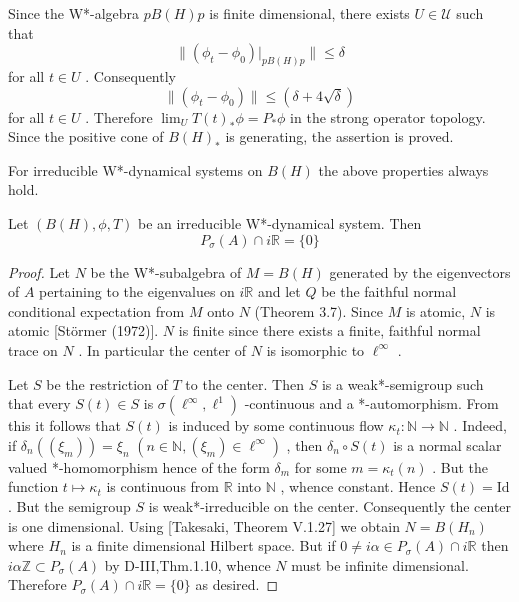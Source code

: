 Since the W*-algebra $ pB(H)p $  is finite dimensional, there exists $ U \in \mathcal{U} $  such that
\[
\|(\phi_{t} - \phi_{0})|_{pB(H)p}\| \leq \delta
\]
for all $ t \in U $ .
Consequently
\[
\|(\phi_{t} - \phi_{0})\| \leq (\delta + 4\sqrt{\delta})
\]
for all $ t \in U $ .
Therefore $ \lim_{U} T(t)_{*}\phi = P_{*}\phi $  in the strong operator topology.
Since the positive cone of $ B(H)_{*} $  is generating, the assertion is proved.

For irreducible W*-dynamical systems on $ B(H) $  the above properties always hold.

\begin{theorem}\label{thm:d4-3.8}
Let $ (B(H),\phi,T) $  be an irreducible W*-dynamical system.
Then
\[
P_{\sigma}(A) \cap i\mathbb{R} = \{0\}
\]
\end{theorem}

\newpage

\begin{proof}
Let $ N $  be the W*-subalgebra of $ M = B(H) $  generated by the eigenvectors of $ A $  pertaining to the eigenvalues on $ i\mathbb{R} $  and let $ Q $  be the faithful normal conditional expectation from $ M $  onto $ N $  (Theorem 3.7).
Since $ M $  is atomic, $ N $  is atomic [Störmer (1972)].
$ N $  is finite since there exists a finite, faithful normal trace on $ N $ .
In particular the center of $ N $  is isomorphic to $ \ell^{\infty} $ .

Let $ S $  be the restriction of $ T $  to the center.
Then $ S $  is a weak*-semigroup such that every $ S(t) \in S $  is $ \sigma(\ell^{\infty},\ell^{1}) $ -continuous and a *-automorphism.
From this it follows that $ S(t) $  is induced by some continuous flow $ \kappa_{t}: \mathbb{N} \to \mathbb{N} $ .
Indeed, if $ \delta_{n}((\xi_{m})) = \xi_{n} $  $ (n \in \mathbb{N}, (\xi_{m}) \in \ell^{\infty}) $ , then $ \delta_{n} \circ S(t) $  is a normal scalar valued *-homomorphism hence of the form $ \delta_{m} $  for some $ m = \kappa_{t}(n) $ .
But the function $ t \mapsto \kappa_{t} $  is continuous from $ \mathbb{R} $  into $ \mathbb{N} $ , whence constant.
Hence $ S(t) = \text{Id} $ .
But the semigroup $ S $  is weak*-irreducible on the center.
Consequently the center is one dimensional.
Using [Takesaki, Theorem V.1.27] we obtain $ N = B(H_{n}) $  where $ H_{n} $  is a finite dimensional Hilbert space.
But if $ 0 \neq i\alpha \in P_{\sigma}(A) \cap i\mathbb{R} $  then $ i\alpha\mathbb{Z} \subset P_{\sigma}(A) $  by D-III,Thm.1.10, whence $ N $  must be infinite dimensional.
Therefore $ P_{\sigma}(A) \cap i\mathbb{R} = \{0\} $  as desired.
\end{proof}

